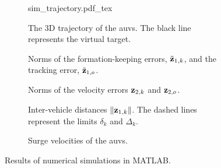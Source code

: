 \begin{figure}[p]
    \centering
    \begin{subfigure}{0.7\textwidth}
        \centering
        \def\svgwidth{\textwidth}
        {sim_trajectory.pdf_tex}
        \vspace*{-6mm}
        \caption{The 3D trajectory of the \glspl{auv}. The black line represents the virtual target.}
        \label{fig:handpos_tracking_trajectory}
    \end{subfigure}  
    \begin{subfigure}{0.47\textwidth}
        \hspace*{-2mm}
        
        \vspace*{-6mm}
        \caption{Norms of the formation-keeping errors, $\tilde{\mathbf{z}}_{1, k}$, and the tracking error, $\tilde{\mathbf{z}}_{1, o}$.}
        \label{fig:handpos_tracking_formation_errors}
    \end{subfigure}
    \begin{subfigure}{0.47\textwidth}
        \hspace*{1mm}
        
        \vspace*{-6mm}
        \caption{Norms of the velocity errors $\mathbf{z}_{2, k}$ and $\mathbf{z}_{2, o}$.}
        \label{fig:handpos_tracking_velocity_errors}
    \end{subfigure}
    \begin{subfigure}{0.47\textwidth}
        \hspace*{-2mm}
        
        \vspace*{-6mm}
        \caption{Inter-vehicle distances $\left\|\mathbf{z}_{1, k}\right\|$. The dashed lines represent the limits $\delta_k$ and $\Delta_k$.}
        \label{fig:handpos_tracking_distances}
    \end{subfigure}
    \begin{subfigure}{0.47\textwidth}
        \vspace*{-40mm}
        \hspace*{1mm}
        
        \vspace*{-6mm}
        \caption{Surge velocities of the \glspl{auv}.}
        \label{fig:handpos_tracking_surge}
    \end{subfigure}
    \caption{Results of numerical simulations in MATLAB.}
    \label{fig:handpos_tracking_sim}
\end{figure}
